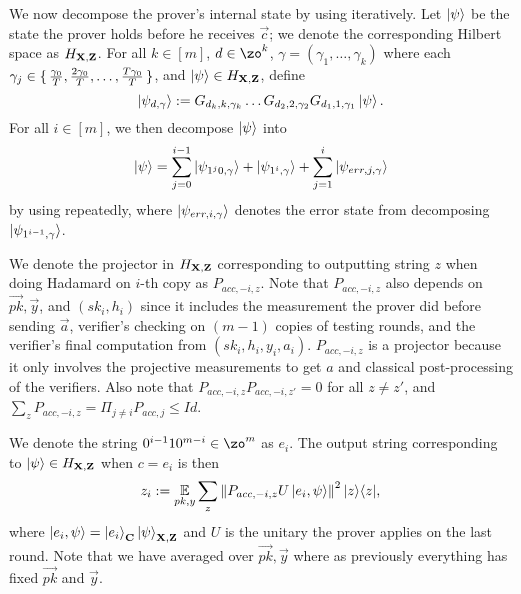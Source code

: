 We now decompose the prover's internal state by using  iteratively.
Let $\ket{\psi}$ be the state the prover holds before he receives $\vec{c}$;
we denote the corresponding Hilbert space as $H_{\mathbf{X},\mathbf{Z}}$.
For all $k \in [m]$, $d\in \zo^k$, $\gamma=(\gamma_1, \ldots, \gamma_k)$ where each $\gamma_j\in\set{\frac{\gamma_0}{T},\frac{2\gamma_0}{T},\dots,\frac{T\gamma_0}{T}}$,  
and $\ket{\psi} \in H_{\mathbf{X},\mathbf{Z}}$, define $$\ket{\psi_{d,\gamma}}:= G_{d_k,k,\gamma_k}\ldots G_{d_2,2,\gamma_2} G_{d_1,1,\gamma_1} \ket{\psi}.$$
For all $i\in[m]$, we then decompose $\ket{\psi}$ into
\begin{equation}
	\label{eq:partition-string}
	\ket{\psi}=\sum_{j=0}^{i-1} \ket{\psi_{1^j0,\gamma}} +\ket{\psi_{1^i,\gamma}} +\sum_{j=1}^{i}\ket{\psi_{err,j,\gamma}}
\end{equation}
by using  repeatedly,  where $\ket{\psi_{err,i,\gamma}}$ denotes the error state from decomposing $\ket{\psi_{1^{i-1},\gamma}}$.

 We denote the projector in $H_{\mathbf{X},\mathbf{Z}}$ corresponding to outputting string $z$ when doing Hadamard on $i$-th copy as $P_{acc,-i,z}$.
Note that $P_{acc,-i,z}$ also depends on $\vec{pk}, \vec{y}$, and $(sk_i, h_i)$ since it includes the measurement the prover did before sending $\vec{a}$,  verifier's checking on $(m-1)$ copies of testing rounds, and  the verifier's final computation from $(sk_i,h_i,y_i,a_i)$. $P_{acc,-i,z}$ is a projector because it only involves the projective measurements to get $a$ and classical post-processing of the verifiers. Also note that  $P_{acc,-i,z} P_{acc,-i,z'}=0$ for all $z\neq z'$, and $\sum_z P_{acc,-i,z} =\Pi_{j \neq i} P_{acc,j}\leq Id$.

We denote the string $0^{i-1}10^{m-i} \in \zo^m$ as $e_i$. The output string corresponding to $\ket{\psi} \in H_{\mathbf{X},\mathbf{Z}}$ when $c=e_i$ is then
\begin{equation}
	\label{eq:zi-def}
	z_i:= \operatorname*{\mathbb{E}}_{pk,y} \sum_z \left\lVert P_{acc,-i,z} U\ket{e_i,\psi}\right\rVert^2|z\rangle\langle z|,
\end{equation}
 where $\ket{e_i,\psi}=\ket{e_i}_{\mathbf{C}}\ket{\psi}_{\mathbf{X},\mathbf{Z}}$ and $U$ is the unitary the prover applies on the last round.
Note that we have averaged over $\vec{pk}, \vec{y}$ where as previously everything has fixed $\vec{pk}$ and $\vec{y}$.

